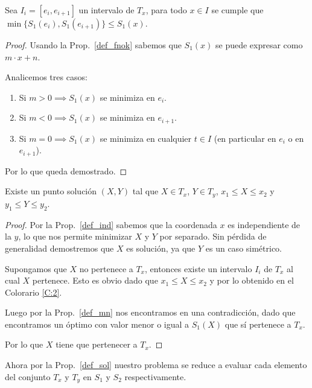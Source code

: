 \begin{proposition}
    Sea $I_i = [e_i, e_{i+1}]$ un intervalo de $T_x$, para todo $x \in I$ se cumple que $\min \{ S_1(e_i), S_1(e_{i+1}) \} \le S_1(x)$.
    \label{def_mn}
\end{proposition}

\begin{proof}
    Usando la Prop.~\ref{def_fnok} sabemos que $S_1(x)$ se puede expresar como $m \cdot x + n$.

    Analicemos tres casos:

    \begin{enumerate}
        \item Si $m > 0 \implies S_1(x)$ se minimiza en $e_i$.
        \item Si $m < 0 \implies S_1(x)$ se minimiza en $e_{i+1}$.
        \item Si $m = 0 \implies S_1(x)$ se minimiza en cualquier $t \in I$ (en particular en $e_i$ o en $e_{i+1}$).
    \end{enumerate}

    Por lo que queda demostrado.
\end{proof}

\begin{proposition}
    Existe un punto solución $(X, Y)$ tal que $X \in T_x$, $Y \in T_y$, $x_1 \le X \le x_2$ y $y_1 \le Y \le y_2$.
    \label{def_sol}
\end{proposition}

\begin{proof}
    \hfill

    Por la Prop.~\ref{def_ind} sabemos que la coordenada $x$ es independiente de la $y$, lo que nos permite minimizar $X$ y $Y$ por separado. Sin pérdida de generalidad demostremos que $X$ es solución, ya que $Y$ es un caso simétrico.
    
    Supongamos que $X$ no pertenece a $T_x$, entonces existe un intervalo $I_i$ de $T_x$ al cual $X$ pertenece. Esto es obvio dado que $x_1 \le X \le x_2$ y por lo obtenido en el Colorario \ref{C:2}.
    
    Luego por la Prop.~\ref{def_mn} nos encontramos en una contradicción, dado que encontramos un óptimo con valor menor o igual a $S_1(X)$ que sí pertenece a $T_x$.
    
    Por lo que $X$ tiene que pertenecer a $T_x$.
\end{proof}

Ahora por la Prop.~\ref{def_sol} nuestro problema se reduce a evaluar cada elemento del conjunto $T_x$ y $T_y$ en $S_1$ y $S_2$ respectivamente.

